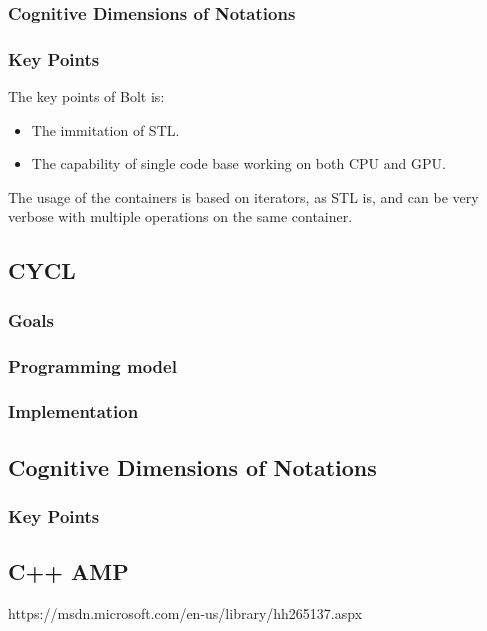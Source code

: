 \subsubsection{Cognitive Dimensions of Notations}

\subsubsection{Key Points}
The key points of Bolt is:

\begin{itemize}
\item The immitation of STL.
\item The capability of single code base working on both CPU and GPU.
\end{itemize}

The usage of the containers is based on iterators, as STL is, and can be very verbose with multiple operations on the same container.


\subsection{CYCL}

\subsubsection{Goals}

\subsubsection{Programming model}

\subsubsection{Implementation}

\subsection{Cognitive Dimensions of Notations}

\subsubsection{Key Points}


\subsection{C++ AMP}
https://msdn.microsoft.com/en-us/library/hh265137.aspx

